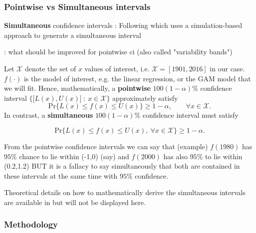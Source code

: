 \subsubsection*{Pointwise vs Simultaneous intervals}

\textbf{Simultaneous} confidence intervals :  Following \citet[Section 4.9, 6.5]{ruppert_semiparametric_2003} which uses a simulation-based approach to generate a simultaneous interval
\citet{marra_coverage_2012}

\citet[p.135]{ruppert_semiparametric_2003} : what should be improved for pointwise ci (also called "variability bands")

Let $\mathcal{X}$ denote the set of $x$ values of interest, i.e. $\mathcal{X}=[1901,2016]$ in our case. $f(\cdot)$ is the model of interest, e.g. the linear regression, or the GAM model that we will fit. Hence, mathematically, a \textbf{pointwise} $100(1-\alpha)\%$ confidence interval $\Big\{\big[L(x),U(x)\big] \ : \ x\in \mathcal{X}\Big\}$ approximately satisfy 
\begin{equation}
\text{Pr}\Big\{L(x)\leq f(x)\leq U(x)\Big\}\geq 1-\alpha, \qquad \forall x\in\mathcal{X}.
\end{equation}
In contrast, a \textbf{simultaneous} $100(1-\alpha)\%$ confidence interval must satisfy 

\begin{equation}
\text{Pr}\Big\{L(x)\leq f(x)\leq U(x), \ \forall x\in\mathcal{X}\Big\}\geq 1-\alpha.
\end{equation}

From the pointwise confidence intervals we can say that (example) $f(1980)$ has $95\%$ chance to lie within (-1,0) (say) and $f(2000)$ has also $95\%$ to lie within (0.2,1.2) BUT it is a fallacy to say simultaneously that both are contained in these intervals at the same time with $95\%$ confidence. \citet[section 6.5]{ruppert_semiparametric_2003}

Theoretical details on how to mathematically derive the simultaneous intervals are available in \citet[pp.142-144]{ruppert_semiparametric_2003} but will not be displayed here.

\subsubsection*{Methodology}


